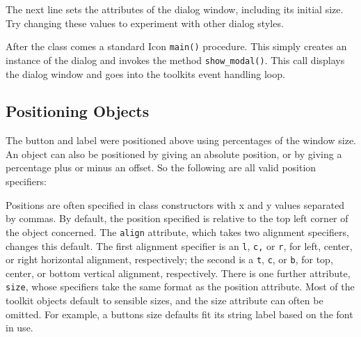 The next line sets the attributes of the dialog window, including its
initial size. Try changing these values to experiment with other dialog
styles.


After the class comes a standard Icon \texttt{main()} procedure. This
simply creates an instance of the dialog and invokes the method
\texttt{show\_modal()}.
This call displays the dialog window and goes into the
toolkit{\textquotesingle}s event handling loop. 

\subsection{Positioning Objects}

The button and label were positioned above using
percentages of the window size. An object can also be
positioned by giving an absolute position, or by giving a percentage
plus or minus an offset. So the following are all valid position
specifiers:


Positions are often specified in class constructors
with x and y values separated by commas. By default, the
position specified is relative to the top left corner of the object
concerned. The \texttt{{\textquotedbl}align{\textquotedbl}}
attribute, which takes two alignment specifiers, changes this
default. The first alignment specifier is an
\texttt{{\textquotedbl}l{\textquotedbl}},
\texttt{{\textquotedbl}c{\textquotedbl}}\texttt{,} or
\texttt{{\textquotedbl}r{\textquotedbl}}, for left, center, or right
horizontal alignment, respectively; the second is a
\texttt{{\textquotedbl}t{\textquotedbl}},
\texttt{{\textquotedbl}c{\textquotedbl}}, or
\texttt{{\textquotedbl}b{\textquotedbl}}, for top, center, or bottom
vertical alignment, respectively. There is one further attribute,
\texttt{{\textquotedbl}size{\textquotedbl}}, whose specifiers take the
same format as the position attribute. Most of the toolkit objects
default to sensible sizes, and the size attribute can often be omitted.
For example, a button{\textquotesingle}s size defaults fit its string label
based on the font in use.

